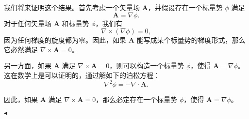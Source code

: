 \documentclass[11pt]{article}
\newenvironment{question}[2][Question]{\begin{trivlist}
\item[\hskip \labelsep {\bfseries #1}\hskip \labelsep {\bfseries #2.}]}{\hfill$\blacktriangleleft$\end{trivlist}}
\begin{document}
\begin{question}{2 (18') (亥姆霍兹分解)}
我们将来证明这个结果。首先考虑一个矢量场 \(\textbf{A}\)，并假设存在一个标量势 \(\phi\) 满足
\[
\textbf{A} = \nabla \phi.
\]
对于任何矢量场 \(\textbf{A}\) 和标量势 \(\phi\)，我们有
\[
\nabla \times (\nabla \phi) = 0,
\]
因为任何梯度的旋度都为零。因此，如果 \(\textbf{A}\) 能写成某个标量势的梯度形式，那么它必然满足 \(\nabla \times \textbf{A} = 0\)。

另一方面，如果 \(\textbf{A}\) 满足 \(\nabla \times \textbf{A} = 0\)，则可以构造一个标量势 \(\phi\)，使得 \(\textbf{A} = \nabla \phi\)。这在数学上是可以证明的，通过解如下的泊松方程：
\[
\nabla^2 \phi = -\nabla \cdot \textbf{A}.
\]

因此，如果 \(\textbf{A}\) 满足 \(\nabla \times \textbf{A} = 0\)，那么必定存在一个标量势 \(\phi\)，使得 \(\textbf{A} = \nabla \phi\)。


    \end{question}
    
\end{document}
